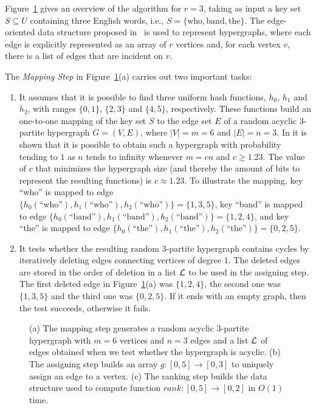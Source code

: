 Figure~\ref{fig:overview} gives an overview of the algorithm for $r=3$,
taking as input a key set $S \subseteq U$ containing three English words, i.e.,  $S=\{\mathrm{who},\mathrm{band},\mathrm{the}\}$.
The edge-oriented data structure proposed in~\cite{e87} is used
to represent hypergraphs, where each edge is explicitly represented
as an array of $r$ vertices and, for each vertex $v$,
there is a list of edges that are incident on $v$.

The {\em Mapping Step} in Figure~\ref{fig:overview}(a) carries out two
important tasks:
\begin{enumerate}
\item
It assumes that it is possible to find three uniform
hash functions, $h_0$, $h_1$ and $h_2$, with ranges $\{0,1\}$, $\{2,3\}$ and $\{4,5\}$, respectively.
These functions build an one-to-one mapping of the key set $S$ to the edge set $E$
of a random acyclic
$3$-partite hypergraph $G=(V,E)$, where $|V|=m=6$ and $|E|=n=3$.
In \cite{b08,bpz07} it is shown that
it is possible to obtain such a hypergraph with probability tending to $1$ as $n$
tends to infinity
whenever $m=cn$ and $c \ge 1.23$. The value of $c$ that minimizes the hypergraph size
(and thereby the amount of bits to represent the resulting functions) is $c \approx 1.23$.
To illustrate the mapping,
key ``who'' is mapped to edge $\{h_0(\text{``who''}),h_1(\text{``who''}),h_2(\text{``who''})\}=\{1,3,5\}$,
key ``band'' is mapped to edge $\{h_0(\text{``band''}),h_1(\text{``band''}),h_2(\text{``band''})\}=\{1,2,4\}$, and
key ``the'' is mapped to edge $\{h_0(\text{``the''}),h_1(\text{``the''}),h_2(\text{``the''})\}=\{0,2,5\}$.
\item
It tests whether the resulting random $3$-partite hypergraph contains cycles
by iteratively deleting edges connecting vertices of degree 1.
The deleted edges are stored in the order of deletion in a list $\cal L$
to be used in the assigning step.
The first deleted edge in Figure~\ref{fig:overview}(a)
was $\{1,2,4\}$, the second one was $\{1,3,5\}$ and
the third one was $\{0,2,5\}$.
If it ends with an empty graph, then the test succeeds,
otherwise it fails.
\end{enumerate}


\begin{figure}
\begin{center}
\end{center}
\caption{(a) The mapping step generates a random acyclic $3$-partite hypergraph with $m=6$ vertices and $n=3$ edges
and a list $\cal L$ of edges obtained when we test whether the hypergraph is acyclic.
(b) The assigning step builds an array $g:[0,5] \to [0,3]$ to uniquely
assign an edge to a vertex. (c) The ranking step builds the data structure used to
compute function $\mathit{rank}: [0,5] \to [0,2]$ in $O(1)$ time.~~~~}
\label{fig:overview}
\end{figure}



